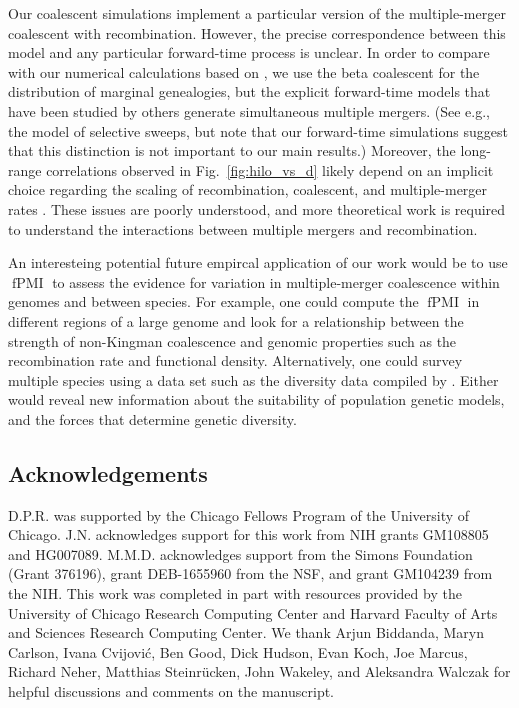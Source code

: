 \documentclass[11pt, letterpaper]{article}   	%
\newcommand{\fig}[1]{Fig.~\ref{#1}}
\DeclareMathOperator{\fpmi}{fPMI}
\begin{document}
Our coalescent simulations implement a particular version of the multiple-merger coalescent with recombination.
However, the precise correspondence between this model and any particular forward-time process is unclear.
In order to compare with our numerical calculations based on \textcite{BirknerEtAl2013}, we use the beta coalescent for the distribution of marginal genealogies, but the explicit forward-time models that have been studied by others generate simultaneous multiple mergers.
(See e.g., the \cite{DurrettSchweinsberg2005} model of selective sweeps, but note that our forward-time simulations suggest that this distinction is not important to our main results.)
Moreover, the long-range correlations observed in \fig{fig:hilo_vs_d} likely depend on an implicit choice regarding the scaling of recombination, coalescent, and multiple-merger rates \autocite{EldonWakeley2006}.
These issues are poorly understood, and more theoretical work is required to understand the interactions between multiple mergers and recombination.

An interesteing potential future empircal application of our work would be to use $\fpmi$ to assess the evidence for variation in multiple-merger coalescence within genomes and between species.
For example, one could compute the $\fpmi$ in different regions of a large genome and look for a relationship between the strength of non-Kingman coalescence and genomic properties such as the recombination rate and functional density.
Alternatively, one could survey multiple species using a data set such as the diversity data compiled by \textcite{Corbett-DetigEtAl2015}.
Either would reveal new information about the suitability of population genetic models, and the forces that determine genetic diversity.

\subsection*{Acknowledgements}
D.P.R. was supported by the Chicago Fellows Program of the University of Chicago.
J.N. acknowledges support for this work from NIH grants GM108805 and HG007089.
M.M.D. acknowledges support from the Simons Foundation (Grant 376196), grant DEB-1655960 from the NSF, and grant GM104239 from the NIH.
This work was completed in part with resources provided by the University of Chicago Research Computing Center and Harvard Faculty of Arts and Sciences Research Computing Center.
We thank
Arjun Biddanda,
Maryn Carlson,
Ivana Cvijovi\'c,
Ben Good,
Dick Hudson,
Evan Koch,
Joe Marcus,
Richard Neher,
Matthias Steinr\"ucken,
John Wakeley,
and Aleksandra Walczak for helpful discussions and comments on the manuscript.
\end{document}
